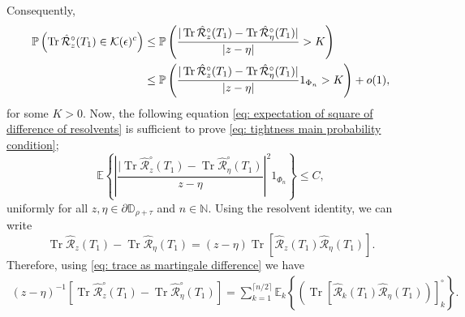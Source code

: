 \documentclass[12pt]{amsart}
\theoremstyle{plain}
\theoremstyle{definition}
\newcommand{\Tr}{\operatorname{Tr}}
\begin{document}
 Consequently,
 \begin{align}
     \mathbb{P}\left(\Tr \hat{\mathcal{R}}_z^{\circ}(T_1)\in \mathcal{K}(\epsilon)^c\right) \notag
     &\leq \mathbb{P}\left(  \frac{| \Tr \hat{\mathcal{R}}_z^{\circ}(T_1)-\Tr \hat{\mathcal{R}}_\eta^{\circ}(T_1)|}{|z-\eta|} > K \right) \notag\\
     &\leq \mathbb{P}\left(   \frac{| \Tr \hat{\mathcal{R}}_z^{\circ}(T_1)-\Tr \hat{\mathcal{R}}_\eta^{\circ}(T_1)|}{|z-\eta|} 1_{\Phi_n} > K \right) + o(1),
 \end{align}
for some $K>0$. Now, the following equation \eqref{eq: expectation of square of difference of resolvents} is sufficient to prove \eqref{eq: tightness main probability condition};
\begin{equation}
    \mathbb{E}\left\{\left|\frac{|\Tr \hat{\mathcal{R}}_z^{\circ}(T_1)-\Tr \hat{\mathcal{R}}_\eta^{\circ}(T_1)}{z-\eta} \right|^2  1_{\Phi_n}\right\} \leq C, \label{eq: expectation of square of difference of resolvents}
\end{equation}
uniformly for all $z, \eta \in \partial{\mathbb{D}}_{\rho+\tau}$ and $n\in \mathbb{N}$. Using the resolvent identity, we can write
$$
\Tr  \hat{\mathcal{R}}_z(T_{1})-\Tr  \hat{\mathcal{R}}_\eta(T_{1})=(z-\eta) \Tr \left[\hat{\mathcal{R}}_z(T_{1})\hat{\mathcal{R}}_\eta(T_{1})\right].
$$
Therefore, using \eqref{eq: trace as martingale difference} we have
\begin{align}
    (z-\eta)^{-1}\left[\Tr  \hat{\mathcal{R}}_z^\circ(T_{1})-\Tr  \hat{\mathcal{R}}_\eta^\circ(T_{1})\right]=\sum_{k=1}^{\lceil n/2 \rceil} \mathbb{E}_k\left\{ \left(\Tr \left[\hat{\mathcal{R}}_k(T_{1}) \hat{\mathcal{R}}_\eta(T_{1})\right)\right]_k^\circ \right\}. \label{eqn: tightness: difference of tr R as a product of R}
\end{align}
\end{document}
